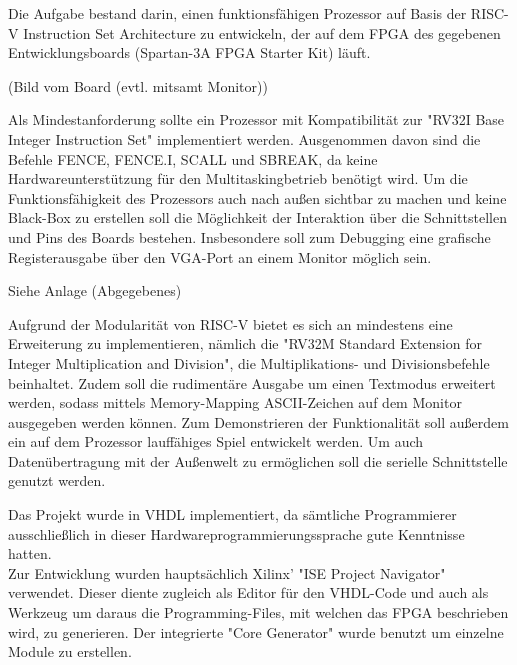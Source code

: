 

Die Aufgabe bestand darin, einen funktionsf\"ahigen Prozessor auf Basis der RISC-V Instruction Set Architecture zu entwickeln, der auf dem FPGA des gegebenen Entwicklungsboards (Spartan-3A FPGA Starter Kit) l\"auft. 



(Bild vom Board (evtl. mitsamt Monitor))


Als Mindestanforderung sollte ein Prozessor mit Kompatibilit\"at zur "RV32I Base Integer Instruction Set" implementiert werden. Ausgenommen davon sind die Befehle FENCE, FENCE.I, SCALL und SBREAK, da keine Hardwareunterst\"utzung f\"ur den Multitaskingbetrieb ben\"otigt wird.
Um die Funktionsf\"ahigkeit des Prozessors auch nach au{\ss}en sichtbar zu machen und keine Black-Box zu erstellen soll die M\"oglichkeit der Interaktion \"uber die Schnittstellen und Pins des Boards bestehen. Insbesondere soll zum Debugging eine grafische Registerausgabe \"uber den VGA-Port an einem Monitor m\"oglich sein.



Siehe Anlage (Abgegebenes)


Aufgrund der Modularit\"at von RISC-V bietet es sich an mindestens eine Erweiterung zu implementieren, n\"amlich die "RV32M Standard Extension for Integer Multiplication and Division", die Multiplikations- und Divisionsbefehle beinhaltet. Zudem soll die rudiment\"are Ausgabe um einen Textmodus erweitert werden, sodass mittels Memory-Mapping ASCII-Zeichen auf dem Monitor ausgegeben werden k\"onnen. Zum Demonstrieren der Funktionalit\"at soll au{\ss}erdem ein auf dem Prozessor lauff\"ahiges Spiel entwickelt werden. Um auch Daten\"ubertragung mit der Au{\ss}enwelt zu erm\"oglichen soll die serielle Schnittstelle genutzt werden.

Das Projekt wurde in VHDL implementiert, da s\"amtliche Programmierer ausschlie{\ss}lich in dieser Hardwareprogrammierungssprache gute Kenntnisse hatten.\\
Zur Entwicklung wurden haupts\"achlich Xilinx' "ISE Project Navigator" verwendet. Dieser diente zugleich als Editor f\"ur den VHDL-Code und auch als Werkzeug um daraus die Programming-Files, mit welchen das FPGA beschrieben wird, zu generieren. Der integrierte "Core Generator" wurde benutzt um einzelne Module zu erstellen.\\


